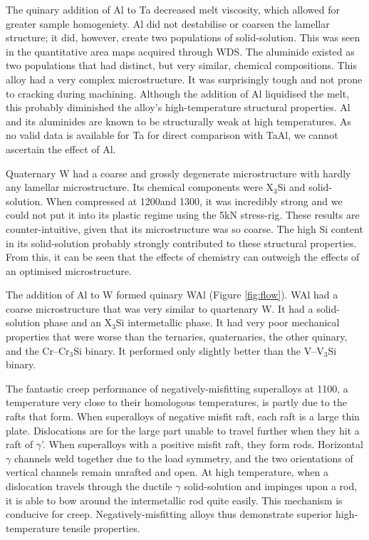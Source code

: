 The quinary addition of Al to Ta decreased melt viscosity, which allowed for greater sample homogeniety.  Al did not destabilise or coarsen the lamellar structure; it did, however, create two populations of solid-solution. This was seen in the quantitative area maps acquired through WDS.  The aluminide existed as two populations that had distinct, but very similar, chemical compositions.  This alloy had a very complex microstructure.  It was surprisingly tough and not prone to cracking during machining.  Although the addition of Al liquidised the melt, this probably diminished the alloy's high-temperature structural properties.  Al and its aluminides are known to be structurally weak at high temperatures.  As no valid data is available for Ta for direct comparison with TaAl, we cannot ascertain the effect of Al.

Quaternary W had a coarse and grossly degenerate microstructure with hardly any lamellar microstructure.  Its chemical components were X$_3$Si and solid-solution.  When compressed at 1200\celsius and 1300\celsius, it was incredibly strong and we could not put it into its plastic regime using the 5kN stress-rig.  These results are counter-intuitive, given that its microstructure was so coarse.  The high Si content in its solid-solution probably strongly contributed to these structural properties.  From this, it can be seen that the effects of chemistry can outweigh the effects of an optimised microstructure.

The addition of Al to W formed quinary WAl (Figure \ref{fig:flow}).  WAl  had a coarse microstructure that was very similar to quartenary W.  It had a solid-solution phase and an X$_3$Si intermetallic phase.  It had very poor mechanical properties that were worse than the ternaries, quaternaries, the other quinary, and the Cr--Cr$_3$Si binary.  It performed only slightly better than the V--V$_3$Si binary.


The fantastic creep performance of negatively-misfitting superalloys at 1100\celsius, a temperature very close to their homologous temperatures, is partly due to the rafts that form.  When superalloys of negative misfit raft, each raft is a large thin plate.  Dislocations are for the large part unable to travel further when they hit a raft of $\gamma$'.  When superalloys with a positive misfit raft, they form rods. Horizontal $\gamma$ channels weld together due to the load symmetry, and the two orientations of vertical channels remain unrafted and open.  At high temperature, when a dislocation travels through the ductile $\gamma$ solid-solution and impinges upon a rod, it is able to bow around the intermetallic rod quite easily.  This mechanism is conducive for creep.  Negatively-misfitting alloys thus demonstrate superior high-temperature tensile properties.


